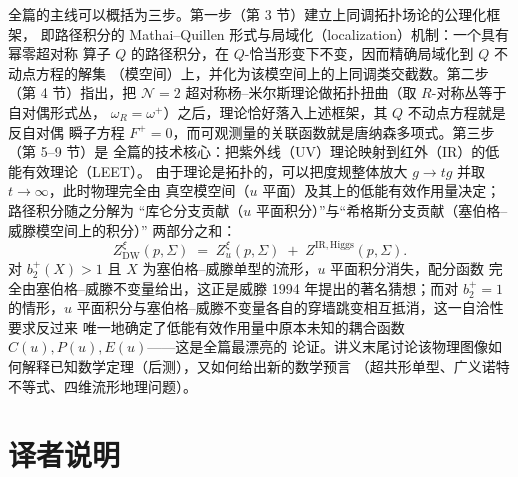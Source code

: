 全篇的主线可以概括为三步。第一步（第 3 节）建立上同调拓扑场论的公理化框架，
即路径积分的 Mathai--Quillen 形式与局域化（localization）机制：一个具有幂零超对称
算子 $Q$ 的路径积分，在 $Q$-恰当形变下不变，因而精确局域化到 $Q$ 不动点方程的解集
（模空间）上，并化为该模空间上的上同调类交截数。第二步（第 4 节）指出，把
$\mathcal{N}=2$ 超对称杨--米尔斯理论做拓扑扭曲（取 $R$-对称丛等于自对偶形式丛，
$\omega_{R}=\omega^{+}$）之后，理论恰好落入上述框架，其 $Q$ 不动点方程就是反自对偶
瞬子方程 $F^{+}=0$，而可观测量的关联函数就是唐纳森多项式。第三步（第 5--9 节）是
全篇的技术核心：把紫外线（UV）理论映射到红外（IR）的低能有效理论（LEET）。
由于理论是拓扑的，可以把度规整体放大 $g\to tg$ 并取 $t\to\infty$，此时物理完全由
真空模空间（$u$ 平面）及其上的低能有效作用量决定；路径积分随之分解为
“库仑分支贡献（$u$ 平面积分）”与“希格斯分支贡献（塞伯格--威滕模空间上的积分）”
两部分之和：
\[
  Z^{\xi}_{\mathrm{DW}}(p,\Sigma)
  \;=\; Z^{\xi}_{u}(p,\Sigma)\;+\;Z^{\mathrm{IR},\mathrm{Higgs}}(p,\Sigma).
\]
对 $b^{+}_{2}(X)>1$ 且 $X$ 为塞伯格--威滕单型的流形，$u$ 平面积分消失，配分函数
完全由塞伯格--威滕不变量给出，这正是威滕 1994 年提出的著名猜想；而对 $b^{+}_{2}=1$
的情形，$u$ 平面积分与塞伯格--威滕不变量各自的穿墙跳变相互抵消，这一自洽性要求反过来
唯一地确定了低能有效作用量中原本未知的耦合函数 $C(u),P(u),E(u)$——这是全篇最漂亮的
论证。讲义末尾讨论该物理图像如何解释已知数学定理（后测），又如何给出新的数学预言
（超共形单型、广义诺特不等式、四维流形地理问题）。

\section*{译者说明}

